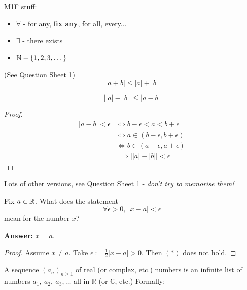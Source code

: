 \documentclass[twoside]{scrartcl}
\begin{document}
\setcounter{page}{4}

M1F stuff:


\begin{itemize}
\item $\forall$ - for any, \textbf{fix any}, for all, every...
\item $\exists$ - there exists
\item $\mathbb{N} - \{1,2,3,\dots\}$ 
\end{itemize}

\begin{theorem}
(See Question Sheet 1)
	\[|a+b| \leq |a| + |b|\]
\end{theorem}

\begin{corollary}
\[\left||a| - |b|\right|\leq |a-b|	\]
\end{corollary}
\begin{proof}
\[
\begin{aligned}
|a-b| < \epsilon &\iff b-\epsilon < a < b + \epsilon\\
&\iff a \in (b-\epsilon, b+\epsilon)\\
&\iff b \in (a-\epsilon, a+\epsilon)	\\
&\implies \left||a| - |b|\right|< \epsilon
\end{aligned} \] 
\end{proof}

Lots of other versions, see Question Sheet 1 - \emph{don't try to memorise them!}\\



\begin{clicker}
Fix $a \in\mathbb{R}$. What does the statement 
\[\forall \epsilon >0,~|x-a|<\epsilon \tag{$*$}\]
mean for the number $x$? 

\textbf{Answer:} $x = a$. 
\begin{proof}
Assume $x \neq a$. Take $\epsilon := \frac{1}{2}|x-a| > 0$. Then $(*)$ does not hold.	
\end{proof}

\end{clicker}




\label{sub:sequences}

A 
sequence $(a_n)_{n\geq 1}$ of real (or complex, etc.) numbers is an infinite list of numbers $a_1,~a_2,~a_3,\dots$ all in $\mathbb{R}$ (or $\mathbb{C}$, etc.) Formally:\\
\end{document}
